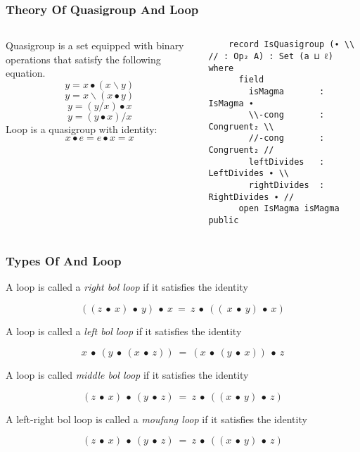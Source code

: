 \documentclass[xcolor={dvipsnames}]{beamer}
\begin{document}
\begin{frame}[fragile]
  \frametitle{Theory Of Quasigroup And Loop}  
  \begin{columns}
    \begin{column}{0.4\textwidth}
      Quasigroup is a set equipped with binary operations that satisfy the
      following equation.
            \[y=x∙(x\backslash y)\]
            \[y=x\backslash(x∙y)\]
            \[y=(y/x)∙x\]
            \[y=(y∙x)/x\]
      Loop is a quasigroup with identity:
      \[x∙e=e∙x=x\]
    \end{column}
    \hfill
    \begin{column}{0.575\textwidth}
\begin{verbatim}
    record IsQuasigroup (∙ \\ // : Op₂ A) : Set (a ⊔ ℓ) where
      field
        isMagma       : IsMagma ∙
        \\-cong       : Congruent₂ \\
        //-cong       : Congruent₂ //
        leftDivides   : LeftDivides ∙ \\
        rightDivides  : RightDivides ∙ //
      open IsMagma isMagma public
\end{verbatim}
    \end{column}
  \end{columns}
\end{frame}


\begin{frame}[fragile]
  \frametitle{Types Of And Loop}

  A loop is called a \textit{right bol loop} if it satisfies the identity

   \[((z\ ∙\ x)\ ∙\ y)\ ∙\ x\ =\ z\ ∙\ ((\ x\ ∙\ y)\ ∙\ x)\]

  A loop is called a \textit{left bol loop} if it satisfies the identity

   \[x\ ∙\ (y\ ∙\ (x\ ∙\ z))\ =\ (x\ ∙\ (y\ ∙\ x))\ ∙\ z\]

  A loop is called \textit{middle bol loop} if it satisfies the identity

  \[(z\ ∙\ x)\ ∙\ (y\ ∙\ z)\ =\ z\ ∙\ ((x\ ∙\ y)\ ∙\ z)\]

  A left-right bol loop is called a \textit{moufang loop} if it satisfies the identity

  \[(z\ ∙\ x)\ ∙\ (y\ ∙\ z)\ =\ z\ ∙\ ((x\ ∙\ y)\ ∙\ z)\]

\end{frame}
\end{document}
